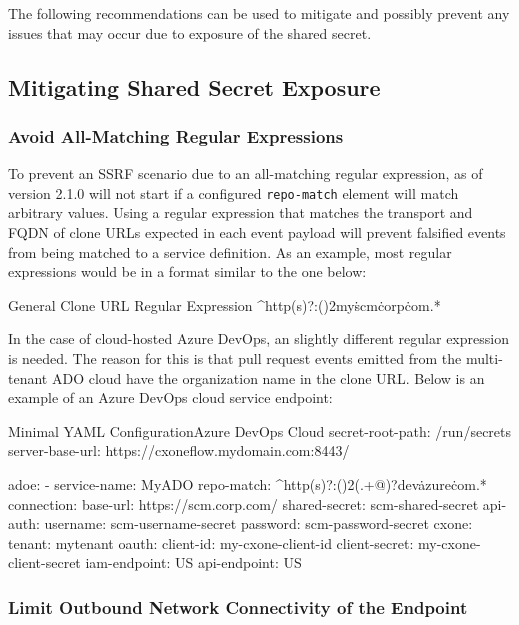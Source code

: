 The following recommendations can be used to mitigate and possibly prevent any
issues that may occur due to exposure of the shared secret.

\subsection{Mitigating Shared Secret Exposure}


\subsubsection{Avoid All-Matching Regular Expressions}

To prevent an SSRF scenario due to an all-matching regular expression, 
\cxoneflow as of version 2.1.0 will not start if a configured \texttt{repo-match} element
will match arbitrary values. Using a regular expression that matches the transport and FQDN
of clone URLs expected in each event payload will prevent falsified events from being matched to a 
service definition.  As an example, most regular expressions would be in a format similar to the one below:

\begin{code}{General Clone URL Regular Expression}{}{}
^http(s)?:(\/){2}my\.scm\.corp\.com.*
\end{code}

In the case of cloud-hosted Azure DevOps, an slightly different regular expression
is needed.  The reason for this is that pull request events emitted from the multi-tenant ADO cloud have
the organization name in the clone URL.  Below is an example of an Azure DevOps cloud
service endpoint:

\begin{code}{Minimal YAML Configuration}{Azure DevOps Cloud}{}
  secret-root-path: /run/secrets
  server-base-url: https://cxoneflow.mydomain.com:8443/
  
  adoe:
      - service-name: MyADO
        repo-match: ^http(s)?:(\/){2}(.+@)?dev\.azure\.com.*
        connection:
        base-url: https://scm.corp.com/
        shared-secret: scm-shared-secret
        api-auth:
          username: scm-username-secret
          password: scm-password-secret
        cxone:
          tenant: mytenant
          oauth:
            client-id: my-cxone-client-id
            client-secret: my-cxone-client-secret
          iam-endpoint: US
          api-endpoint: US
\end{code}
  
\subsubsection{Limit Outbound Network Connectivity of the \cxoneflowtext\space Endpoint}

